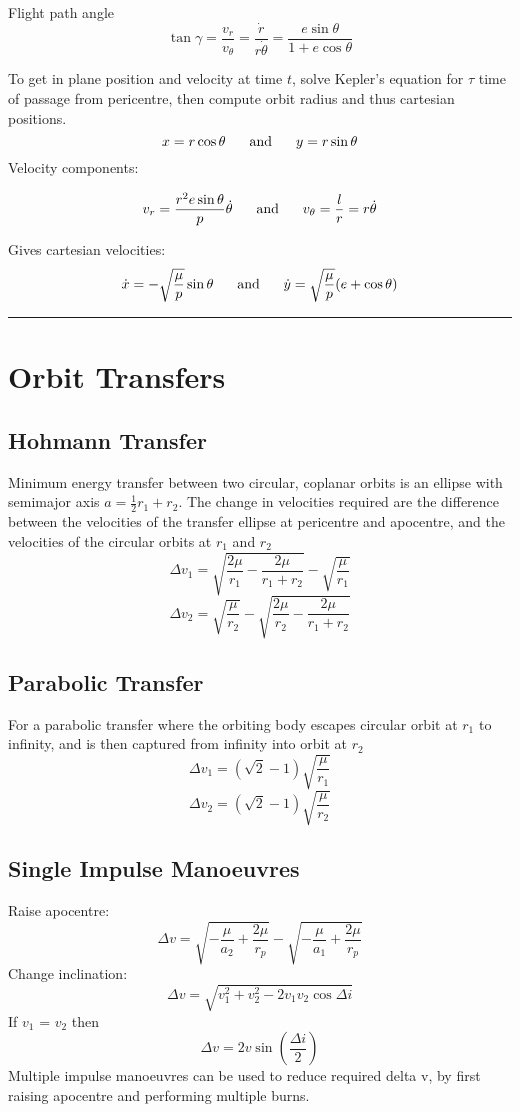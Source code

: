 \documentclass[table,cmyk,fleqn]{article}
\begin{document}
\begin{longtable}
Flight path angle
\[\tan \gamma = \frac{v_r}{v_\theta}=\frac{\dot{r}}{r\dot{\theta}}=\frac{e\sin \theta}{1+e \cos \theta}\]

To get in plane position and velocity at time $t$, solve Kepler's equation for $\tau$ time of passage from pericentre, then compute orbit radius and thus cartesian positions.
\[x = r\cos \theta \text{\hspace{0.6cm}and\hspace{0.6cm}} y = r\sin \theta\]
Velocity components:
\begin{boldmath}\[v_r = \frac{r^2e\sin \theta}{p}\dot{\theta}\text{\hspace{0.6cm}and\hspace{0.6cm}}v_\theta = \frac{l}{r} = r\dot{\theta}\]\end{boldmath}
Gives cartesian velocities:
\[\dot{x} = -\sqrt{\frac{\mu}{p}}\sin \theta \text{\hspace{0.6cm}and\hspace{0.6cm}}\dot{y} = \sqrt{\frac{\mu}{p}}(e+\cos \theta)\]
\noindent\rule{9cm}{0.4pt}
\section*{Orbit Transfers}
\subsection*{Hohmann Transfer}
Minimum energy transfer between two circular, coplanar orbits is an ellipse with semimajor axis $a = \frac{1}{2}r_1 + r_2$. The change in velocities required are the difference between the velocities of the transfer ellipse at pericentre and apocentre, and the velocities of the circular orbits at $r_1$ and $r_2$
\[\Delta v_1 = \sqrt{\frac{2\mu}{r_1}-\frac{2\mu}{r_1+r_2}}-\sqrt{\frac{\mu}{r_1}}\]
\[\Delta v_2 = \sqrt{\frac{\mu}{r_2}}-\sqrt{\frac{2\mu}{r_2}-\frac{2\mu}{r_1+r_2}}\]
\subsection*{Parabolic Transfer}
For a parabolic transfer where the orbiting body escapes circular orbit at $r_1$ to infinity, and is then captured from infinity into orbit at $r_2$
\[\Delta v_1 = (\sqrt{2}-1)\sqrt{\frac{\mu}{r_1}}\]
\[\Delta v_2 = (\sqrt{2}-1)\sqrt{\frac{\mu}{r_2}}\]
\subsection*{Single Impulse Manoeuvres}
Raise apocentre:
\[\Delta v = \sqrt{-\frac{\mu}{a_2}+\frac{2\mu}{r_p}}-\sqrt{-\frac{\mu}{a_1}+\frac{2\mu}{r_p}}\]
\tabularnewline\hline
Change inclination:
\[\Delta v = \sqrt{v_1^2+v_2^2-2v_1v_2\cos \Delta i}\]
If $v_1$ = $v_2$ then
\[\Delta v = 2v\sin \left( \frac{\Delta i}{2}\right)\]
Multiple impulse manoeuvres can be used to reduce required delta v, by first raising apocentre and performing multiple burns.


\end{longtable}
\end{document}
